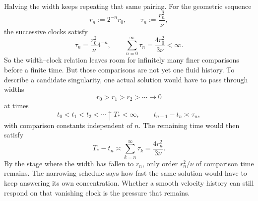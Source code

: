 Halving the width keeps repeating that same pairing. For the geometric sequence
\[
  r_n:=2^{-n}r_0,
  \qquad
  \tau_n:=\frac{r_n^2}{\nu},
\]
the successive clocks satisfy
\[
  \tau_n
  =
  \frac{r_0^2}{\nu}4^{-n},
  \qquad
  \sum_{n=0}^{\infty}\tau_n
  =
  \frac{4r_0^2}{3\nu}
  <
  \infty.
\]
So the width--clock relation leaves room for infinitely many finer comparisons before a finite time. But those comparisons are not yet one fluid history. To describe a candidate singularity, one actual solution would have to pass through widths
\[
  r_0>r_1>r_2>\cdots\longrightarrow0
\]
at times
\[
  t_0<t_1<t_2<\cdots\uparrow T_*<\infty,
  \qquad
  t_{n+1}-t_n\asymp\tau_n,
\]
with comparison constants independent of \(n\). The remaining time would then satisfy
\[
  T_*-t_n
  \asymp
  \sum_{k=n}^{\infty}\tau_k
  =
  \frac{4r_n^2}{3\nu}.
\]
By the stage where the width has fallen to \(r_n\), only order \(r_n^2/\nu\) of comparison time remains. The narrowing schedule says how fast the same solution would have to keep answering its own concentration. Whether a smooth velocity history can still respond on that vanishing clock is the pressure that remains.